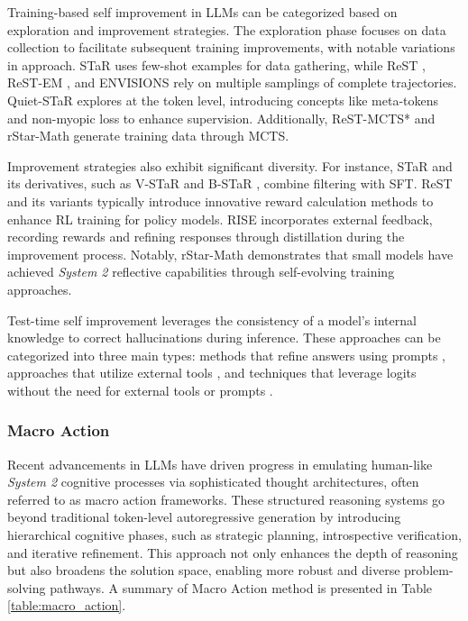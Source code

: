 Training-based self improvement in LLMs can be categorized based on exploration and improvement strategies. 
The exploration phase focuses on data collection to facilitate subsequent training improvements, with notable variations in approach. 
STaR \cite{DBLP:conf/nips/ZelikmanWMG22} uses few-shot examples for data gathering, while ReST \cite{DBLP:journals/corr/abs-2308-08998}, ReST-EM \cite{singh2024humandatascalingselftraining}, and ENVISIONS \cite{DBLP:journals/corr/abs-2406-11736} rely on multiple samplings of complete trajectories. 
Quiet-STaR \cite{QuietStar} explores at the token level, introducing concepts like meta-tokens and non-myopic loss to enhance supervision. 
Additionally, ReST-MCTS* \cite{zhang2024rest} and rStar-Math \cite{guan2025rstarmathsmallllmsmaster} generate training data through MCTS.




Improvement strategies also exhibit significant diversity. 
For instance, STaR and its derivatives, such as V-STaR \cite{hosseini2024vstartrainingverifierselftaught} and B-STaR \cite{zeng2024bstarmonitoringbalancingexploration}, combine filtering with SFT. 
ReST and its variants typically introduce innovative reward calculation methods to enhance RL training for policy models. 
RISE \cite{qu2024recursiveintrospectionteachinglanguage} incorporates external feedback, recording rewards and refining responses through distillation during the improvement process. 
Notably, rStar-Math \cite{guan2025rstarmathsmallllmsmaster} demonstrates that small models have achieved \textit{System 2} reflective capabilities through self-evolving training approaches.


Test-time self improvement leverages the consistency of a model's internal knowledge to correct hallucinations during inference. 
These approaches can be categorized into three main types: methods that refine answers using prompts \cite{DBLP:conf/nips/MadaanTGHGW0DPY23, DBLP:conf/iclr/MiaoTR24}, approaches that utilize external tools \cite{DBLP:conf/iclr/GouSGSYDC24}, and techniques that leverage logits without the need for external tools or prompts \cite{DBLP:journals/corr/abs-2403-19094, xu2023lookbackdecodingopenendedtext}.




\subsubsection{Macro Action}\label{macro_action}

Recent advancements in LLMs have driven progress in emulating human-like \textit{System 2} cognitive processes via sophisticated thought architectures, often referred to as macro action frameworks. 
These structured reasoning systems go beyond traditional token-level autoregressive generation by introducing hierarchical cognitive phases, such as strategic planning, introspective verification, and iterative refinement. 
This approach not only enhances the depth of reasoning but also broadens the solution space, enabling more robust and diverse problem-solving pathways. A summary of Macro Action method is presented in Table \ref{table:macro_action}.




